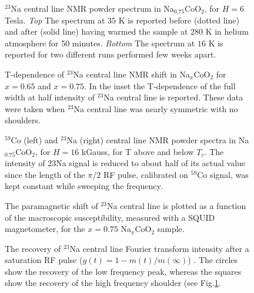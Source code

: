 \documentclass[prb,showpacs,preprintnumbers,amsmath,amssymb,floatfix]{revtex4}
\begin{document}
\begin{figure}
 \caption{$^{23}$Na
central line NMR powder spectrum in Na$_{0.75}$CoO$_2$, for $H= 6$
Tesla. {\it Top} The spectrum at $35$ K is reported before (dotted
line) and after (solid line) having warmed the sample at 280 K in
helium atmosphere for 50 minutes. {\it Bottom} The spectrum at
$16$ K is reported for two different runs performed few weeks
apart.} \label{spna}
\end{figure}

\begin{figure}
 \caption{T-dependence
of $^{23}$Na central line NMR shift in Na$_x$CoO$_2$ for $x=0.65$
and $x=0.75$. In the inset the T-dependence of the full width at
half intensity of $^{23}$Na central line is reported. These data
were taken when $^{23}$Na central line was nearly symmetric with
no shoulders.} \label{shiftNa}
\end{figure}



\begin{figure}
 \caption{$^{59}$Co
(left) and $^{23}$Na (right) central line NMR powder spectra in
Na$_{0.75}$CoO$_2$, for $H= 16$ kGauss, for T above and below
$T_c$. The intensity of ${23}$Na signal is reduced to about half
of its actual value since the length of the $\pi/2$ RF pulse,
calibrated on $^{59}$Co signal, was kept constant while sweeping
the frequency.} \label{spCoTc}
\end{figure}

\begin{figure}
 \caption{The
paramagnetic shift of $^{23}$Na central line is plotted as a
function of the macroscopic susceptibility, measured with a SQUID
magnetometer, for the $x=0.75$ Na$_x$CoO$_2$ sample. }
\label{DKChi}
\end{figure}



\begin{figure}
 \caption{The recovery
of $^{23}$Na central line Fourier transform intensity after a
saturation RF pulse ($y(t)= 1-m(t)/m(\infty)$) . The circles show
the recovery of the low frequency peak, whereas the squares show
the recovery of the high frequency shoulder (see Fig.\ref{spna}.}
\label{recNa}
\end{figure}
\end{document}
